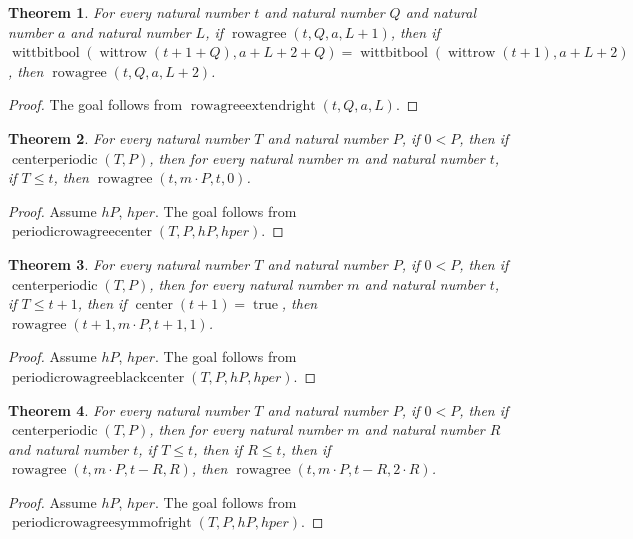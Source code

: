 \documentclass[11pt]{article}
\newtheorem{theorem}{Theorem}[section]
\theoremstyle{definition}
\begin{document}
\begin{theorem}
\label{ll:paper:rowagree-extend-right}
For every natural number \(t\) and natural number \(Q\) and natural number \(a\) and natural number \(L\), if \(\operatorname{rowagree}(t, Q, a, L + 1)\), then if \(\operatorname{wittbitbool}(\operatorname{wittrow}(t + 1 + Q), a + L + 2 + Q) = \operatorname{wittbitbool}(\operatorname{wittrow}(t + 1), a + L + 2)\), then \(\operatorname{rowagree}(t, Q, a, L + 2)\).
\end{theorem}
\begin{proof}
The goal follows from \(\operatorname{rowagreeextendright}(t, Q, a, L)\).
\end{proof}
\begin{theorem}
\label{ll:paper:periodic-rowagree-center}
For every natural number \(T\) and natural number \(P\), if \(0 < P\), then if \(\operatorname{centerperiodic}(T, P)\), then for every natural number \(m\) and natural number \(t\), if \(T \le t\), then \(\operatorname{rowagree}(t, m \cdot P, t, 0)\).
\end{theorem}
\begin{proof}
Assume \(hP\), \(hper\).
The goal follows from \(\operatorname{periodicrowagreecenter}(T, P, hP, hper)\).
\end{proof}
\begin{theorem}
\label{ll:paper:periodic-rowagree-black-center}
For every natural number \(T\) and natural number \(P\), if \(0 < P\), then if \(\operatorname{centerperiodic}(T, P)\), then for every natural number \(m\) and natural number \(t\), if \(T \le t + 1\), then if \(\operatorname{center}(t + 1) = \operatorname{true}\), then \(\operatorname{rowagree}(t + 1, m \cdot P, t + 1, 1)\).
\end{theorem}
\begin{proof}
Assume \(hP\), \(hper\).
The goal follows from \(\operatorname{periodicrowagreeblackcenter}(T, P, hP, hper)\).
\end{proof}
\begin{theorem}
\label{ll:paper:periodic-rowagree-symm-of-right}
For every natural number \(T\) and natural number \(P\), if \(0 < P\), then if \(\operatorname{centerperiodic}(T, P)\), then for every natural number \(m\) and natural number \(R\) and natural number \(t\), if \(T \le t\), then if \(R \le t\), then if \(\operatorname{rowagree}(t, m \cdot P, t - R, R)\), then \(\operatorname{rowagree}(t, m \cdot P, t - R, 2 \cdot R)\).
\end{theorem}
\begin{proof}
Assume \(hP\), \(hper\).
The goal follows from \(\operatorname{periodicrowagreesymmofright}(T, P, hP, hper)\).
\end{proof}
\end{document}
